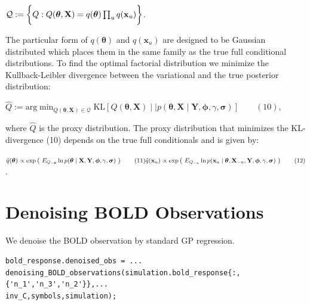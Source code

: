 \begin{par}
$\mathcal{Q} := \bigg{\{} Q : Q(\boldsymbol{\theta},\mathbf{X}) = q(\boldsymbol{\theta}) \prod_uq(\mathbf{x}_u) \bigg{\}}$.
\end{par} \vspace{1em}
\begin{par}
The particular form of $q(\boldsymbol{\theta})$ and $q(\mathbf{x}_u)$ are designed to be Gaussian distributed which places them in the same family as the true full conditional distributions. To find the optimal factorial distribution we minimize the Kullback-Leibler divergence between the variational and the true posterior distribution:
\end{par} \vspace{1em}
\begin{par}
$\hat{Q} := \mathrm{arg} \min_{Q(\boldsymbol{\theta},\mathbf{X}) \in \mathcal{Q}} \mathrm{KL}\left[ Q(\boldsymbol{\theta},\mathbf{X}) \mid \mid p(\boldsymbol{\theta},\mathbf{X} \mid\mathbf{Y},\boldsymbol{\phi}, \gamma,\boldsymbol\sigma) \right] \qquad (10)$,
\end{par} \vspace{1em}
\begin{par}
where $\hat{Q}$ is the proxy distribution. The proxy distribution that minimizes the KL-divergence (10) depends on the true full conditionals and is given by:
\end{par} \vspace{1em}
\begin{par}
$\hat{q}({\boldsymbol{\theta}}) \propto \exp \left(~ E_{Q_{-\boldsymbol{\theta}}} \ln p(\boldsymbol{\theta} \mid\mathbf{X},\mathbf{Y},\boldsymbol{\phi},\gamma,\boldsymbol\sigma) ~\right) \qquad (11)\\\hat{q}(\mathbf{x}_u) \propto \exp\left( ~ E_{Q_{-u}} \ln p(\mathbf{x}_u\mid \boldsymbol{\theta}, \mathbf{X}_{-u},\mathbf{Y},\boldsymbol{\phi},\gamma,\boldsymbol{\sigma}) ~ \right)\qquad (12)$.
\end{par} \vspace{1em}


\section{Denoising BOLD Observations}

\begin{par}
We denoise the BOLD observation by standard GP regression.
\end{par} \vspace{1em}
\color{RoyalPurple}\begin{verbatim}
bold_response.denoised_obs = ...
denoising_BOLD_observations(simulation.bold_response{:,{'n_1','n_3','n_2'}},...
inv_C,symbols,simulation);
\end{verbatim} 
\color{black}
\clearpage

